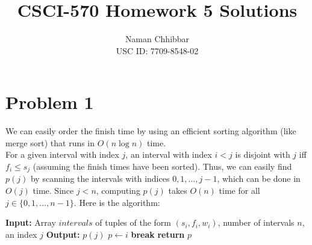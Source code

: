 \documentclass{article}
\title{CSCI-570 Homework 5 Solutions}
\author{
  Naman Chhibbar \\
  USC ID: 7709-8548-02
}
\date{}
\begin{document}
\maketitle

\section{Problem 1}
  We can easily order the finish time by using an efficient sorting algorithm (like merge sort) that runs in $O(n\log n)$ time. \\
  For a given interval with index $j$, an interval with index $i < j$ is disjoint with $j$ iff $f_i \leq s_j$ (assuming the finish times have been sorted).
  Thus, we can easily find $p(j)$ by scanning the intervals with indices $0, 1, \dots, j-1$, which can be done in $O(j)$ time.
  Since $j < n$, computing $p(j)$ takes $O(n)$ time for all $j \in \{0, 1, \dots, n-1\}$.
  Here is the algorithm:
  \begin{algorithm}
    \caption{Calculating $p(j)$}
    \begin{algorithmic}[1]
      \State \textbf{Input:} Array $intervals$ of tuples of the form $(s_i, f_i, w_i)$, number of intervals $n$, an index $j$
      \State \textbf{Output:} $p(j)$
          \State $p \gets i$
          \State \textbf{break}
        \EndIf
      \EndFor
      \State \textbf{return} $p$
    \end{algorithmic}
  \end{algorithm}
\end{document}
